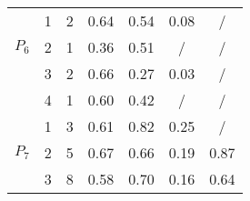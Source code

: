 \documentclass[11pt]{article}
\begin{document}
\begin{table}
\begin{tabular}{ccc|c|c|c|c|}
\multicolumn{1}{|c|}{\multirow{3}{*}{$P_6$}} & \multicolumn{1}{c|}{1} 
 & 2 & 0.64 & 0.54 & 0.08 & / \\ \cline{2-7} 
\multicolumn{1}{|c|}{} & \multicolumn{1}{c|}{2} 
 & 1 & 0.36 & 0.51 & / & / \\ \cline{2-7} 
\multicolumn{1}{|c|}{} & \multicolumn{1}{c|}{3} 
 & 2 & 0.66 & 0.27 & 0.03 & / \\ \cline{2-7} 
\multicolumn{1}{|c|}{} & \multicolumn{1}{c|}{4} 
 & 1 & 0.60 & 0.42 & / & / \\ \hline \hline

\multicolumn{1}{|c|}{\multirow{3}{*}{$P_7$}} & \multicolumn{1}{c|}{1} 
 & 3 & 0.61 & 0.82 & 0.25 & / \\ \cline{2-7} 
\multicolumn{1}{|c|}{} & \multicolumn{1}{c|}{2} 
 & 5 & 0.67 & 0.66 & 0.19 & 0.87 \\ \cline{2-7} 
\multicolumn{1}{|c|}{} & \multicolumn{1}{c|}{3} 
 & 8 & 0.58 & 0.70 & 0.16 & 0.64 \\ \hline

\end{tabular}
\end{table}
\end{document}
